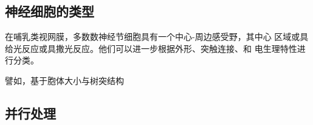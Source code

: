 \subsection{神经细胞的类型}
在哺乳类视网膜，多数数神经节细胞具有一个中心-周边感受野，其中心
区域或具给光反应或具撒光反应。他们可以进一步根据外形、突触连接、和
电生理特性进行分类。

譬如，基于胞体大小与树突结构
\subsection{并行处理}